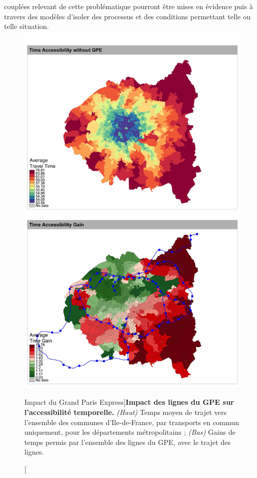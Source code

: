 couplées relevant de cette problématique pourront être mises en évidence puis à travers des modèles d'isoler des processus et des conditions permettant telle ou telle situation.



\begin{figure}
	\includegraphics[width=\linewidth]{Figures/Final/1-2-1-fig-casestudies-gpe.jpg}
	\caption[Impact of \emph{Grand Paris Express}][Impact du Grand Paris Express]{\label{fig:casestudies:gpe}}{\textbf{Impact des lignes du GPE sur l'accessibilité temporelle.} \textit{(Haut)} Temps moyen de trajet vers l'ensemble des communes d'Ile-de-France, par transports en commun uniquement, pour les départements métropolitains ; \textit{(Bas)} Gains de temps permis par l'ensemble des lignes du GPE, avec le trajet des lignes.\label{fig:casestudies:gpe}}
\end{figure}
